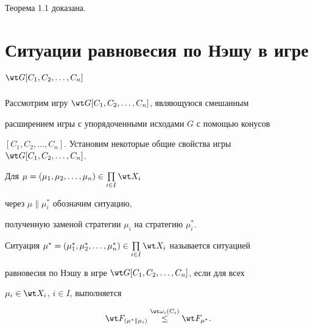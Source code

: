 Теорема 1.1 доказана.


 


 


\section{Ситуации равновесия по Нэшу в игре $\wt G[C_1,C_2,\dotsc,C_n]$} 


 


Рассмотрим игру $\wt G[C_1,C_2,\dotsc,C_n]$, являющуюся смешанным 


расширением игры с упорядоченными исходами $G$ с помощью конусов 


$[C_1,C_2,\dotsc,C_n]$. Установим некоторые общие свойства игры $\wt 


G[C_1,C_2,\dotsc,C_n]$. 


 


Для $\mu=(\mu_1,\mu_2,\dotsc,\mu_n)\in\prod\limits_{i\in I}\wt X_i$ 


через $\mu\|\mu^*_i$ обозначим ситуацию, 


полученную заменой стратегии $\mu_i$ на стратегию $\mu^*_i$. 


 


\begin{defns} 


Ситуация $\mu^*=(\mu^*_1,\mu^*_2,\dotsc,\mu^*_n)\in \prod\limits_{i\in 


I}\wt X_i$ называется ситуацией 


равновесия по Нэшу в игре $\wt G[C_1,C_2,\dotsc,C_n]$, если для всех 


$\mu_i\in\wt X_i$, $i\in I$,  выполняется 


\begin{equation} 


\wt F_{(\mu^*\|\mu_i)}\up{\wt\omega_i(C_i)}{\le}\wt F_{\mu^*}. 


\end{equation} 


\end{defns} 


 


